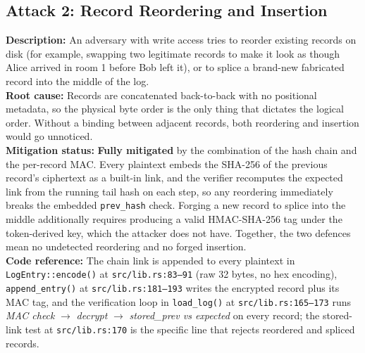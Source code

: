 \documentclass[a4paper, 12pt]{article}
\begin{document}
    \subsection{Attack 2: Record Reordering and Insertion}
    \textbf{Description:} An adversary with write access tries to reorder existing records on disk (for example, swapping two legitimate records to make it look as though Alice arrived in room 1 before Bob left it), or to splice a brand-new fabricated record into the middle of the log. \\
    \textbf{Root cause:} Records are concatenated back-to-back with no positional metadata, so the physical byte order is the only thing that dictates the logical order. Without a binding between adjacent records, both reordering and insertion would go unnoticed. \\
    \textbf{Mitigation status:} \textbf{Fully mitigated} by the combination of the hash chain and the per-record MAC. Every plaintext embeds the SHA-256 of the previous record's ciphertext as a built-in link, and the verifier recomputes the expected link from the running tail hash on each step, so any reordering immediately breaks the embedded \texttt{prev\_hash} check. Forging a new record to splice into the middle additionally requires producing a valid HMAC-SHA-256 tag under the token-derived key, which the attacker does not have. Together, the two defences mean no undetected reordering and no forged insertion. \\
    \textbf{Code reference:} The chain link is appended to every plaintext in \texttt{LogEntry::encode()} at \texttt{src/lib.rs:83--91} (raw 32 bytes, no hex encoding), \texttt{append\_entry()} at \texttt{src/lib.rs:181--193} writes the encrypted record plus its MAC tag, and the verification loop in \texttt{load\_log()} at \texttt{src/lib.rs:165--173} runs \emph{MAC check} $\rightarrow$ \emph{decrypt} $\rightarrow$ \emph{stored\_prev vs expected} on every record; the stored-link test at \texttt{src/lib.rs:170} is the specific line that rejects reordered and spliced records.
\end{document}

